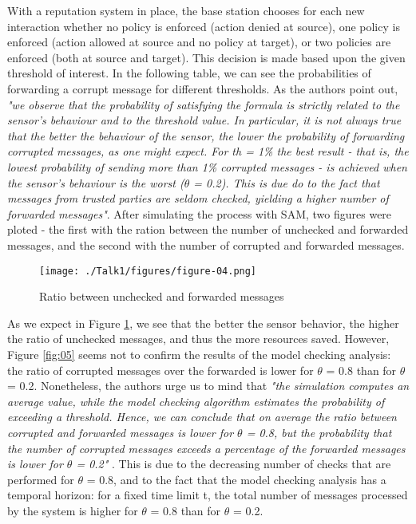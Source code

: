 \documentclass[12pt,a4paper,twoside]{report}
\begin{document}
With a reputation system in place, the base station chooses for each new interaction whether no policy is enforced (action denied at source), one policy is enforced (action allowed at source and no policy at target), or two policies are enforced (both at source and target). This decision is made based upon the given threshold of interest. In the following table, we can see the probabilities of forwarding a corrupt message for different thresholds. As the authors point out, \emph{"we observe that the probability of satisfying the formula is strictly related to the sensor's behaviour and to the threshold value. In particular, it is not always true that the better the behaviour of the sensor, the lower the probability of forwarding corrupted messages, as one might expect. For th = 1\% the best result - that is, the lowest probability of sending more than 1\% corrupted messages - is achieved when the sensor's behaviour is the worst ($\theta$ = 0.2). This is due do to the fact that messages from trusted parties are seldom checked, yielding a higher number of forwarded messages"}. After simulating the process with SAM, two figures were ploted - the first with the ration between the number of unchecked and forwarded messages, and the second with the number of corrupted and forwarded messages.\par

\begin{figure}[ht]
	\begin{center}
  \texttt{[image: ./Talk1/figures/figure-04.png]}
  \end{center}
  \caption{Ratio between unchecked and forwarded messages \cite{vigo;etal:2014}}
  \label{fig:04}
\end{figure}

As we expect in Figure \ref{fig:04}, we see that the better the sensor behavior, the higher the ratio of unchecked messages, and thus the more resources saved. However, Figure \ref{fig:05} seems not to confirm the results of the model checking analysis: the ratio of corrupted messages over the forwarded is lower for $\theta$ = 0.8 than for $\theta$ = 0.2. Nonetheless, the authors urge us to mind that \emph{"the simulation computes an average value, while the model checking algorithm estimates the probability of exceeding a threshold. Hence, we can conclude that on average the ratio between corrupted and forwarded messages is lower for $\theta$ = 0.8, but the probability that the number of corrupted messages exceeds a percentage of the forwarded messages is lower for $\theta$ = 0.2"} \cite{vigo;etal:2014}. This is due to the decreasing number of checks that are performed for $\theta$ = 0.8, and to the fact that the model checking analysis has a temporal horizon: for a fixed time limit t, the total number of messages processed by the system is higher for $\theta$ = 0.8 than for $\theta$ = 0.2.\par
\end{document}
